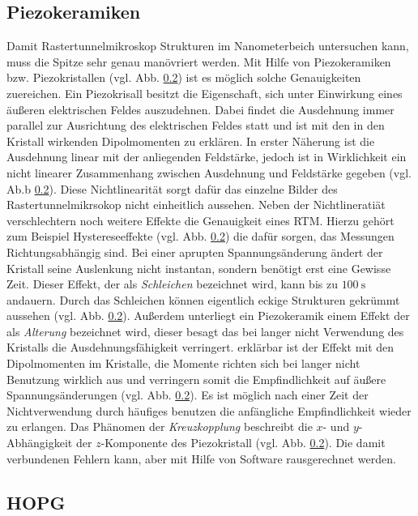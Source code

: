 \subsection{Piezokeramiken}
Damit Rastertunnelmikroskop Strukturen im Nanometerbeich untersuchen kann, muss
die Spitze sehr genau manövriert werden. Mit Hilfe von Piezokeramiken bzw.
Piezokristallen (vgl. Abb. \ref{}) ist es möglich solche Genauigkeiten zuereichen.
Ein Piezokrisall besitzt die Eigenschaft, sich unter Einwirkung eines äußeren
elektrischen Feldes auszudehnen. Dabei findet die Ausdehnung immer parallel zur
Ausrichtung des elektrischen Feldes statt und ist mit den in den Kristall wirkenden
Dipolmomenten zu erklären. In erster Näherung ist die Ausdehnung linear mit der anliegenden Feldstärke,
jedoch ist in Wirklichkeit ein nicht linearer Zusammenhang zwischen Ausdehnung und Feldstärke
gegeben (vgl. Ab.b \ref{}). Diese Nichtlinearität sorgt dafür das einzelne Bilder des
Rastertunnelmikrsokop nicht einheitlich aussehen. Neben der Nichtlineratiät verschlechtern noch weitere
Effekte die Genauigkeit eines RTM. Hierzu gehört zum Beispiel Hystereseeffekte (vgl. Abb. \ref{}) die dafür sorgen,
das Messungen Richtungsabhängig sind.
Bei einer aprupten Spannungsänderung ändert der Kristall seine Auslenkung nicht instantan, sondern benötigt erst eine Gewisse Zeit.
Dieser Effekt, der als \emph{Schleichen} bezeichnet wird, kann bis zu $\SI{100}{\second}$ andauern.
Durch das Schleichen können eigentlich eckige Strukturen gekrümmt aussehen (vgl. Abb. \ref{}).
Außerdem unterliegt ein Piezokeramik einem Effekt der als \emph{Alterung} bezeichnet wird, dieser besagt
das bei langer nicht Verwendung des Kristalls die Ausdehnungsfähigkeit verringert. erklärbar ist der Effekt mit den
Dipolmomenten im Kristalle, die Momente richten sich bei langer nicht Benutzung wirklich aus und verringern
somit die Empfindlichkeit auf äußere Spannungsänderungen (vgl. Abb. \ref{}). Es ist möglich nach einer Zeit der Nichtverwendung
durch häufiges benutzen die anfängliche Empfindlichkeit wieder zu erlangen.
Das Phänomen der \emph{Kreuzkopplung} beschreibt die $x$- und $y$-Abhängigkeit der $z$-Komponente des Piezokristall (vgl. Abb. \ref{}).
Die damit verbundenen Fehlern kann, aber mit Hilfe von Software rausgerechnet werden.

\subsection{HOPG}
